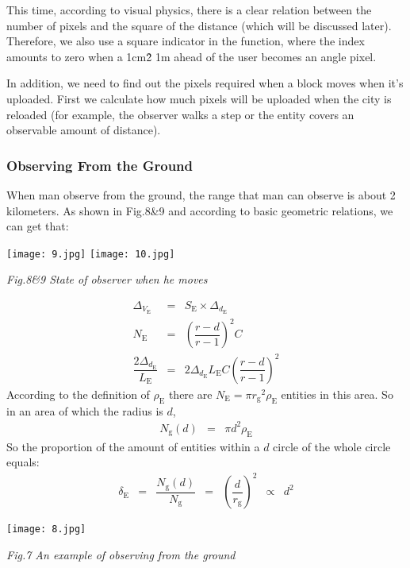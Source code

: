 \documentclass[12pt]{article}
\theoremstyle{definition}
\theoremstyle{remark}
\numberwithin{equation}{section}
\begin{document}
		This time, according to visual physics, there is a clear relation between the number of pixels and the square of the distance (which will be discussed later). Therefore, we also use a square indicator in the function, where the index amounts to zero when a 1cm\^2 1m ahead of the user becomes an angle pixel.
		
		In addition, we need to find out the pixels required when a block moves when it's uploaded. First we calculate how much pixels will be uploaded when the city is reloaded (for example, the observer walks a step or the entity covers an observable amount of distance). 
		\subsubsection{Observing From the Ground}
		When man observe from the  ground, the range that man can observe is about 2 kilometers. As shown in Fig.8\&9 and according to basic geometric relations, we can get that:
		
		\begin{center}
			\texttt{[image: 9.jpg]}
			\texttt{[image: 10.jpg]}
			
			\textit{Fig.8\&9 State of observer when he moves}
		\end{center} 
		\begin{align}
			\Delta_{V_\mathrm{E}}&=&S_\mathrm{E}\times\Delta_{d_\mathrm{E}}\\
			N_\mathrm{E}&=&\left(\dfrac{r-d}{r-1}\right)^2 C\\
			\dfrac{2\Delta_{d_\mathrm{E}}}{L_\mathrm{E}}&=&2\Delta_{d_\mathrm{E}}L_\mathrm{E}C\left(\dfrac{r-d}{r-1}\right)^2
		\end{align}
		According to the definition of $\rho_\mathrm{E}$ there are $N_\mathrm{E}=\pi {r_\mathrm{g}}^2 \rho_\mathrm{E}$ entities in this area. So in an area of which the radius is $d$, 
		\begin{align}
			N_\mathrm{g}(d)&=&\pi d^2 \rho_\mathrm{E}
		\end{align}
		So the proportion of the amount of entities within a $d$ circle of the whole circle equals:
		\begin{align}
			\delta_\mathrm{E}&=&\dfrac{N_\mathrm{g}(d)}{N_\mathrm{g}}&=&\left(\dfrac{d}{r_\mathrm{g}}\right)^2&\propto&d^2
		\end{align}
		\begin{center}
		\texttt{[image: 8.jpg]}
		
		\textit{Fig.7 An example of observing from the ground }
		\end{center}
	
\end{document}
